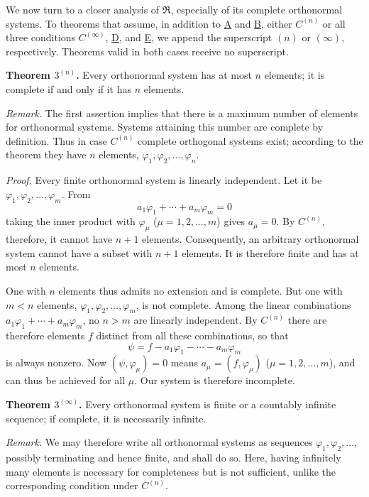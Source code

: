 \documentclass[fontsize=13pt,twoside,openany,headings=normal,parskip=false,bookmarkpackage=false,DIV=calc]{scrbook}
\begin{document}
We now turn to a closer analysis of $\mathfrak{R}$, especially of its complete orthonormal systems. To theorems that assume, in addition to \hyperref[ax:II.A]{A} and \hyperref[ax:II.B]{B}, either \hyperref[ax:II.Cn]{$C^{(n)}$} or all three conditions \hyperref[ax:II.Cinfty]{$C^{(\infty)}$}, \hyperref[ax:II.D]{D}, and \hyperref[ax:II.E]{E}, we append the superscript $(n)$ or $(\infty)$, respectively. Theorems valid in both cases receive no superscript.

\leavevmode{}\textbf{Theorem $3^{(n)}$.}\label{thm:II.3n} Every orthonormal system has at most $n$ elements; it is complete if and only if it has $n$ elements.

\emph{Remark.} The first assertion implies that there is a maximum number of elements for orthonormal systems. Systems attaining this number are complete by definition. Thus in case \hyperref[ax:II.Cn]{$C^{(n)}$} complete orthogonal systems exist; according to the theorem they have $n$ elements, $\varphi_1,\varphi_2,\ldots,\varphi_n$.

\emph{Proof.} Every finite orthonormal system is linearly independent. Let it be $\varphi_1,\varphi_2,\ldots,\varphi_m$. From
\[
a_1\varphi_1+\cdots+a_m\varphi_m=0
\]
taking the inner product with $\varphi_\mu$ ($\mu=1,2,\ldots,m$) gives $a_\mu=0$. By \hyperref[ax:II.Cn]{$C^{(n)}$}, therefore, it cannot have $n+1$ elements. Consequently, an arbitrary orthonormal system cannot have a subset with $n+1$ elements. It is therefore finite and has at most $n$ elements.

\hypertarget{origpage-26}{}%
One with $n$ elements thus admits no extension and is complete. But one with $m<n$ elements, $\varphi_1,\varphi_2,\ldots,\varphi_m$, is not complete. Among the linear combinations $a_1\varphi_1+\cdots+a_m\varphi_m$, no $n>m$ are linearly independent. By \hyperref[ax:II.Cn]{$C^{(n)}$} there are therefore elements $f$ distinct from all these combinations, so that
\[
\psi=f-a_1\varphi_1-\cdots-a_m\varphi_m
\]
is always nonzero. Now $(\psi,\varphi_\mu)=0$ means $a_\mu=(f,\varphi_\mu)$ ($\mu=1,2,\ldots,m$), and can thus be achieved for all $\mu$. Our system is therefore incomplete.

\leavevmode{}\textbf{Theorem $3^{(\infty)}$.}\label{thm:II.3infty} Every orthonormal system is finite or a countably infinite sequence; if complete, it is necessarily infinite.

\emph{Remark.} We may therefore write all orthonormal systems as sequences $\varphi_1,\varphi_2,\ldots$, possibly terminating and hence finite, and shall do so. Here, having infinitely many elements is necessary for completeness but is not sufficient, unlike the corresponding condition under \hyperref[ax:II.Cn]{$C^{(n)}$}.
\end{document}
